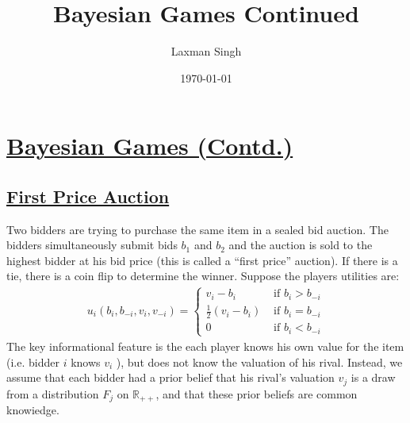 \documentclass[12pt,a4paper]{article}
\author{Laxman Singh}
\date{\today}
\title{Bayesian Games Continued}
\begin{document}
 \section{\underline{Bayesian Games (Contd.)}}
   \subsection{\underline{First Price Auction}} 

 Two bidders are trying to purchase the same item in a sealed bid auction. The bidders simultaneously submit bids \(b_1\) and \(b_2\) and the auction is sold to the highest bidder at his bid price (this is called a ``first price'' auction). If there is a tie, there is a coin flip to determine the winner. Suppose the players utilities are:
 \begin{align*}
 u_i\left(b_i, b_{-i}, v_i, v_{-i}\right)= \begin{cases}v_i-b_i & \text { if } b_i>b_{-i} \\ \frac{1}{2}\left(v_i-b_i\right) & \text { if } b_i=b_{-i} \\ 0 & \text { if } b_i<b_{-i}\end{cases}
 \end{align*}
 The key informational feature is the each player knows his own value for the item (i.e. bidder \(i\) knows \(v_i\) ), but does not know the valuation of his rival. Instead, we assume that each bidder had a prior belief that his rival's valuation \(v_j\) is a draw from a distribution \(F_j\) on \(\mathbb{R}_{++}\), and that these prior beliefs are common knowiedge.
 
\end{document}
